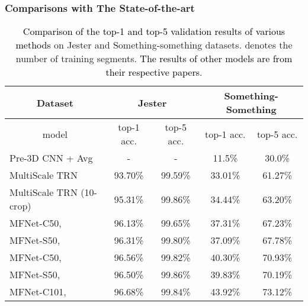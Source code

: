 \documentclass[runningheads]{llncs}
\newcommand{\nj}[1]{\textcolor{black}{#1}}
\begin{document}
\subsubsection{Comparisons with The State-of-the-art}
\setlength{\tabcolsep}{4pt}
\begin{table}[t]
\begin{center}
\caption{\nj{Comparison of the top-1 and top-5 validation results of various methods} on Jester and Something-something datasets.  denotes the number of training segments. \nj{The results of other models are from their respective papers.}}
\begin{tabular}{l|c|c|c|c}
\hline
\multicolumn{1}{c|}{Dataset} & \multicolumn{2}{c|}{Jester} & \multicolumn{2}{c}{Something-Something} \\
\hline
\multicolumn{1}{c|}{model} & top-1 acc.& top-5 acc.& top-1 acc.& top-5 acc.\\
\hline
Pre-3D CNN + Avg\cite{goyal2017something}			& -		  & -       & 11.5\%  & 30.0\%  \\
MultiScale TRN\cite{zhou2017temporal}  				& 93.70\% & 99.59\% & 33.01\% & 61.27\% \\
MultiScale TRN (10-crop)\cite{zhou2017temporal}  	& 95.31\% & 99.86\% & 34.44\% & 63.20\% \\
\hline
MFNet-C50, 									& 96.13\% & 99.65\% & 37.31\% & 67.23\% \\
MFNet-S50, 									& 96.31\% & 99.80\% & 37.09\% & 67.78\% \\
MFNet-C50, 									& 96.56\% & 99.82\% & 40.30\% & 70.93\% \\
MFNet-S50, 									& 96.50\% & 99.86\% & 39.83\% & 70.19\% \\
MFNet-C101,  									& 96.68\% & 99.84\% & 43.92\% & 73.12\% \\
\hline
\end{tabular}
\label{table:valid_performance}
\end{center}
\end{table}
\setlength{\tabcolsep}{1.4pt}
\end{document}
